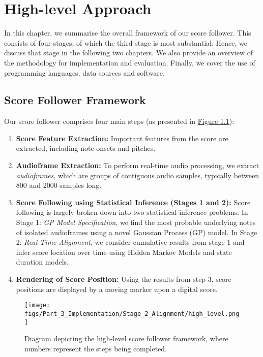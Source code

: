 \chapter{High-level Approach}{\label{ch:high_level_approach}}
In this chapter, we summarise the overall framework of our score follower. This consists of four stages, of which the third stage is most substantial. Hence, we discuss that stage in the following two chapters. We also provide an overview of the methodology for implementation and evaluation. Finally, we cover the use of programming languages, data sources and software.  


\section{Score Follower Framework}{\label{section:score_follower_framework}}
Our score follower comprises four main steps (as presented in \hyperref[fig:high_level]{Figure \ref*{fig:high_level}}):
\begin{enumerate}
    \item \textbf{Score Feature Extraction:} Important features from the score are extracted, including note onsets and pitches.   
    \item \textbf{Audioframe Extraction:} To perform real-time audio processing, we extract \textit{audioframes}, which are groups of contiguous audio samples, typically between 800 and 2000 samples long.
    \item \textbf{Score Following using Statistical Inference (Stages 1 and 2):} Score following is largely broken down into two statistical inference problems. In Stage 1: \textit{GP Model Specification}, we find the most probable underlying notes of isolated audioframes using a novel Gaussian Process (GP) model. In Stage 2: \textit{Real-Time Alignment}, we consider cumulative results from stage 1 and infer score location over time using Hidden Markov Models and state duration models.
    \item \textbf{Rendering of Score Position:} Using the results from step 3, score positions are displayed by a moving marker upon a digital score.  
\end{enumerate}


\begin{figure}[H]
    \centering
    \texttt{[image: figs/Part\_3\_Implementation/Stage\_2\_Alignment/high\_level.png]}
    \caption{Diagram depicting the high-level score follower framework, where numbers represent the steps being completed.}
    \label{fig:high_level}
\end{figure}

